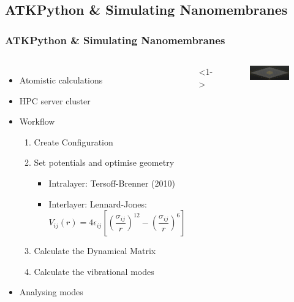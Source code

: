 \documentclass[hyperref={colorlinks=true,urlcolor=blue,linkcolor=.},aspectratio=1610,mathserif]{beamer}
\begin{document}
\subsection{ATKPython \& Simulating Nanomembranes}

\begin{frame}
 \frametitle{ATKPython \& Simulating Nanomembranes}
 \begin{columns}[T]
  \begin{itemize}
   \item<1-> Atomistic calculations
   \item<2-> HPC server cluster
   \item<3-> Workflow
         \begin{enumerate}
          \item<3-> Create Configuration
          \item<4-> Set potentials and optimise geometry
                \begin{itemize}
                 \item Intralayer: Tersoff-Brenner (2010)
                 \item Interlayer: Lennard-Jones:\begin{equation}
                        V_{ij}(r) = 4 \epsilon_{ij} \left[ \left( \frac{\sigma_{ij}}{r} \right) ^{12} - \left( \frac{\sigma_{ij}}{r} \right) ^6 \right] \nonumber
                       \end{equation}
                \end{itemize}
          \item<5-> Calculate the Dynamical Matrix
          \item<6-> Calculate the vibrational modes
         \end{enumerate}
   \item<7-> Analysing modes
  \end{itemize}
  <1->
  \begin{figure}
   \centering
   \includegraphics[width=\columnwidth]{Figures/NanoLayer5nm.png}

\end{figure}
\end{columns}
\end{frame}
\end{document}
